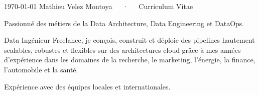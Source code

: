 \documentclass[11pt, a4paper]{awesome-cv}
\begin{document}
\makecvheader

\makecvfooter
{\today}
{Mathieu Velez Montoya~~~·~~~Curriculum Vitae}
{}


\begin{cvparagraph}
	Passionné des métiers de la Data Architecture, Data Engineering et DataOps.

	Data Ingénieur Freelance, je conçois, construit et déploie des pipelines hautement scalables, robustes et flexibles sur des architectures cloud grâce à mes années d'expérience dans les domaines de la recherche,
	le marketing, l'énergie, la finance, l'automobile et la santé.

	Expérience avec des équipes locales et internationales.
\end{cvparagraph}





\end{document}
